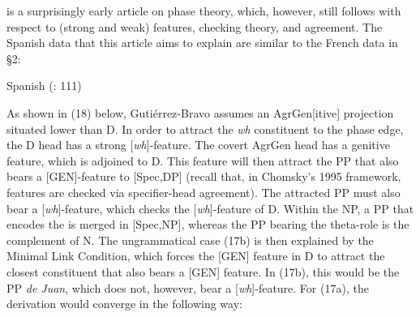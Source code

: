 \documentclass[output=paper]{langsci/langscibook}
\begin{document}
\citet{Gutiérrez-Bravo2001} is a surprisingly early article on phase theory, which, however, still follows \citet{Chomsky1995} with respect to (strong and weak) features, checking theory, and agreement. The Spanish data that this article aims to explain are similar to the French data in §2:

\ea%
Spanish (\citealt{Gutiérrez-Bravo2001}: 111)\label{ex:mensch:17}\\
    \z
\z

As shown in (18) below, Gutiérrez-Bravo assumes an AgrGen[itive] projection situated lower than D. In order to attract the \textit{wh} constituent to the phase edge, the D head has a strong [\textit{wh}]-feature. The covert AgrGen head has a genitive feature, which is adjoined to D. This feature will then attract the PP that also bears a [GEN]-feature to [Spec,DP] (recall that, in Chomsky’s 1995 framework, features are checked via specifier-head agreement). The attracted PP must also bear a [\textit{wh}]-feature, which checks the [\textit{wh}]-feature of D. Within the NP, a PP that encodes the \AGENT is merged in [Spec,NP], whereas the PP bearing the \THEME theta-role is the complement of N. The ungrammatical case (17b) is then explained by the Minimal Link Condition, which forces the [GEN] feature in D to attract the closest constituent that also bears a [GEN] feature. In (17b), this would be the PP \textit{de Juan}, which does not, however, bear a [\textit{wh}]-feature. For (17a), the derivation would converge in the following way:
\end{document}
